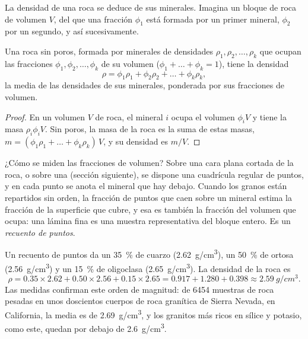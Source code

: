 La densidad de una roca se deduce de sus minerales. Imagina un bloque de roca
de volumen $V$, del que una fracción $\phi_1$ está formada por un primer
mineral, $\phi_2$ por un segundo, y así sucesivamente.

\begin{proposition}\label{prop:g11:minerals:density}
Una roca sin poros, formada por minerales de densidades $\rho_1, \rho_2, \dots,
\rho_k$ que ocupan las fracciones $\phi_1, \phi_2, \dots, \phi_k$ de su volumen
($\phi_1 + \dots + \phi_k = 1$), tiene la densidad
\[
  \rho = \phi_1 \rho_1 + \phi_2 \rho_2 + \dots + \phi_k \rho_k ,
\]
la media de las densidades de sus minerales, ponderada por sus fracciones de
volumen.
\end{proposition}

\begin{proof}
En un volumen $V$ de roca, el mineral $i$ ocupa el volumen $\phi_i V$ y tiene
la masa $\rho_i \phi_i V$. Sin poros, la masa de la roca es la suma de estas
masas, $m = (\phi_1 \rho_1 + \dots + \phi_k \rho_k)\,V$, y su densidad es
$m/V$.
\end{proof}

¿Cómo se miden las fracciones de volumen? Sobre una cara plana cortada de la
roca, o sobre una  (sección siguiente), se dispone una
cuadrícula regular de puntos, y en cada punto se anota el mineral que hay
debajo. Cuando los granos están repartidos sin orden, la fracción de puntos
que caen sobre un mineral estima la fracción de la superficie que cubre, y esa
es también la fracción del volumen que ocupa: una lámina fina es una muestra
representativa del bloque entero. Es un \emph{recuento de puntos}.

\begin{example}
Un recuento de puntos da un \qty{35}{\percent} de cuarzo (\qty{2.62}{g/cm^3}),
un \qty{50}{\percent} de ortosa (\qty{2.56}{g/cm^3}) y un \qty{15}{\percent}
de oligoclasa (\qty{2.65}{g/cm^3}). La densidad de la roca es
\[
  \rho = 0.35 \times 2.62 + 0.50 \times 2.56 + 0.15 \times 2.65
       = 0.917 + 1.280 + 0.398 \approx \qty{2.59}{g/cm^3}.
\]
Las medidas confirman este orden de magnitud: de \num{6454} muestras de roca
pesadas en unos doscientos cuerpos de roca granítica de Sierra Nevada, en
California, la media es de \qty{2.69}{g/cm^3}, y los granitos más ricos en
sílice y potasio, como este, quedan por debajo de \qty{2.6}{g/cm^3}.
\end{example}

